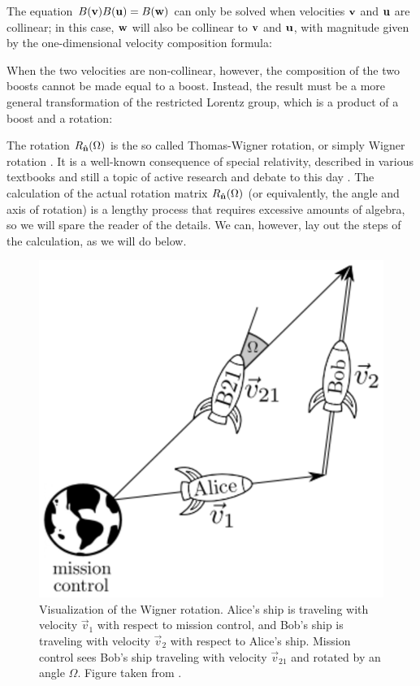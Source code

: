 \documentclass[12pt,a4paper,notitlepage]{report}
\begin{document}
The equation $B(\vb{v})B(\vb{u})=B(\vb{w})$ can only be solved when velocities $\vb{v}$ and $\vb{u}$ are collinear; in this case, $\vb{w}$ will also be collinear to $\vb{v}$ and $\vb{u}$, with magnitude given by the one-dimensional velocity composition formula:

%
When the two velocities are non-collinear, however, the composition of the two boosts cannot be made equal to a boost. Instead, the result must be a more general transformation of the restricted Lorentz group, which is a product of a boost and a rotation:

%
The rotation $R_{\vu{n}}(\Omega)$ is the so called Thomas-Wigner rotation, or simply Wigner rotation \cite{thomas_1926, wigner_1939}. It is a well-known consequence of special relativity, described in various textbooks \cite{jackson_1975, goldstein_1980} and still a topic of active research and debate to this day \cite{mocanu_1992, visser_2011, rebilas_2013, yarman_2020}.
The calculation of the actual rotation matrix $R_{\vu{n}}(\Omega)$ (or equivalently, the angle and axis of rotation) is a lengthy process that requires excessive amounts of algebra, so we will spare the reader of the details. We can, however, lay out the steps of the calculation, as we will do below.

\begin{figure}[t]
  \centering
  \includegraphics[scale=.6]{../Figuras/wig-rot-1.eps}
  \captionsetup{font=footnotesize, margin=8pt}
  \caption{Visualization of the Wigner rotation. Alice's ship is traveling with velocity $\vec{v}_1$ with respect to mission control, and Bob's ship is traveling with velocity $\vec{v}_2$ with respect to Alice's ship. Mission control sees Bob's ship traveling with velocity $\vec{v}_{21}$ and rotated by an angle $\Omega$. Figure taken from \cite{visser_2011}.}
  \label{alice-bob-rotation}
\end{figure}
\end{document}

